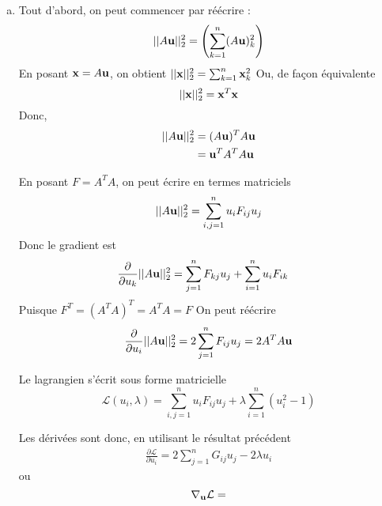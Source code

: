 \documentclass[letterpaper,12pt,oneside,final]{book}
\begin{document}
\begin{enumerate}[a)]

\item %
Tout d'abord, on peut commencer par réécrire : 
\[ \lvert \lvert  A\vb{u} \rvert \rvert_{2}^{2} = \left( \sum_{k=1}^{n} (A\vb{u})_{k}^{2} \right)  \]
En posant \( \vb{x} = A\vb{u} \), on obtient \( \lvert \lvert  \vb{x} \rvert \rvert_{2}^{2} = \sum_{k=1}^{n} \vb{x}_{k}^{2} \)
Ou, de façon équivalente 
\[ \lvert \lvert  \vb{x} \rvert \rvert^{2}_{2} = \vb{x}^{T}\vb{x} \]
Donc, 
\begin{equation*}
\begin{split}
    \lvert \lvert  A\vb{u} \rvert \rvert_{2}^{2}  & = (A\vb{u})^{T}A\vb{u} \\ 
& = \vb{u}^{T}A^{T}A\vb{u}
\end{split}
\end{equation*}

En posant \( F = A^{T}A \), on peut écrire en termes matriciels 
\begin{equation*}
\begin{split}
\lvert \lvert  A \vb{u} \rvert \rvert_{2}^{2} & = \sum_{i,j=1}^{n} u_{i}F_{ij}u_{j}\\
\end{split}
\end{equation*}
Donc le gradient est 
\begin{equation*}
\begin{split}
    \frac{\partial}{\partial u_{k}} \lvert \lvert A\vb{u} \rvert \rvert_{2}^{2} & = \sum_{j=1}^{n} F_{kj}u_{j} + \sum_{i=1}^{n} u_{i}F_{ik}  
\end{split}
\end{equation*}
Puisque \( F^{T} = (A^{T}A)^{T} = A^{T} A = F \)
On peut réécrire 
\[ \frac{\partial }{\partial u_{i}} \lvert \lvert  A\vb{u} \rvert \rvert_{2}^{2} = 2 \sum_{j=1}^{n} F_{ij}u_{j} = 2 A^{T}A\vb{u}\]

Le lagrangien s'écrit sous forme matricielle
\[\mathcal{L}(u_{i},\lambda) = \sum_{i,j = 1}^{n} u_{i}F_{ij}u_{j} + \lambda \sum_{i=1}^{n} (u_{i}^{2}-1) \]

Les dérivées sont donc, en utilisant le résultat précédent
\begin{equation*}
\begin{split}
\frac{\partial \mathcal{L}}{\partial u_{i}} = 2 \sum_{j=1}^{n} G_{ij}u_{j} - 2\lambda u_{i}
\end{split}
\end{equation*}
ou 
\[ \nabla_{\vb{u}} \mathcal{L} =  \]


\end{enumerate}
\end{document}
